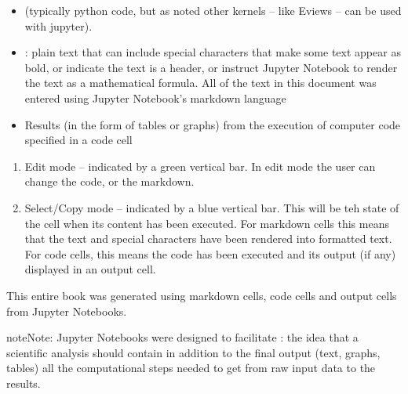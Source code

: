 \documentclass[letterpaper,10pt,english]{jupyterBook}
\begin{document}
\sphinxAtStartPar
{}
\begin{itemize}
\item {} 
\sphinxAtStartPar
{} (typically python code, but as noted other kernels – like Eviews – can be used with jupyter).

\item {} 
\sphinxAtStartPar
{}: plain text that can include special characters that make some text appear as bold, or indicate the text is a header, or instruct Jupyter Notebook to render the text as a mathematical formula.  All of the text in this document was entered using Jupyter Notebook’s markdown language

\item {} 
\sphinxAtStartPar
Results (in the form of tables or graphs) from the execution of computer code specified in a code cell

\end{itemize}

\sphinxAtStartPar
{}
\begin{enumerate}
%
\item {} 
\sphinxAtStartPar
Edit mode – indicated by a green vertical bar. In edit mode the user can change the code, or the markdown.

\item {} 
\sphinxAtStartPar
Select/Copy mode – indicated by a blue vertical bar.  This will be teh state of the cell when its content has been executed.  For markdown cells this means that the text and special characters have been rendered into formatted text.  For code cells, this means the code has been executed and its output (if any) displayed in an output cell.

\end{enumerate}

\sphinxAtStartPar
{}

\sphinxAtStartPar
This entire book was generated using markdown cells, code cells and output cells from Jupyter Notebooks.

\begin{sphinxadmonition}{note}{Note:}
\sphinxAtStartPar
Jupyter Notebooks were designed to facilitate : the idea that a scientific analysis should contain \sphinxhyphen{} in addition to the final output (text, graphs, tables) \sphinxhyphen{} all the computational steps needed to get from raw input data to the results.
\end{sphinxadmonition}
\end{document}
